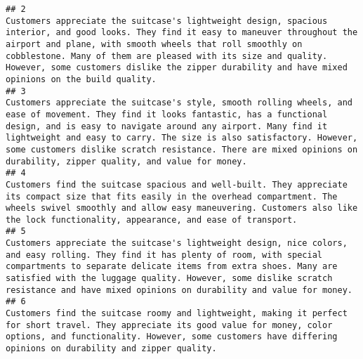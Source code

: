 \documentclass[
]{article}
\begin{document}
\begin{verbatim}
## 2                                                                                                                                                                                                                                                    Customers appreciate the suitcase's lightweight design, spacious interior, and good looks. They find it easy to maneuver throughout the airport and plane, with smooth wheels that roll smoothly on cobblestone. Many of them are pleased with its size and quality. However, some customers dislike the zipper durability and have mixed opinions on the build quality.
## 3                                                                                                                                                                                                                      Customers appreciate the suitcase's style, smooth rolling wheels, and ease of movement. They find it looks fantastic, has a functional design, and is easy to navigate around any airport. Many find it lightweight and easy to carry. The size is also satisfactory. However, some customers dislike scratch resistance. There are mixed opinions on durability, zipper quality, and value for money.
## 4                                                                                                                                                                                                                                                                                                                                                   Customers find the suitcase spacious and well-built. They appreciate its compact size that fits easily in the overhead compartment. The wheels swivel smoothly and allow easy maneuvering. Customers also like the lock functionality, appearance, and ease of transport.
## 5                                                                                                                                                                                                                                                                             Customers appreciate the suitcase's lightweight design, nice colors, and easy rolling. They find it has plenty of room, with special compartments to separate delicate items from extra shoes. Many are satisfied with the luggage quality. However, some dislike scratch resistance and have mixed opinions on durability and value for money.
## 6                                                                                                                                                                                                                                                                                                                                                                        Customers find the suitcase roomy and lightweight, making it perfect for short travel. They appreciate its good value for money, color options, and functionality. However, some customers have differing opinions on durability and zipper quality.

\end{verbatim}
\end{document}
